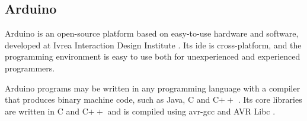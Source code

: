 \subsection{Arduino}
\label{sec:progplatarduino}
Arduino is an open-source platform based on easy-to-use hardware and software, developed at Ivrea Interaction Design Institute  \cite{arduino2}. Its \acrfull{ide} is cross-platform, and the programming environment is easy to use both for unexperienced and experienced programmers.

Arduino programs may be written in any programming language with a compiler that produces binary machine code, such as Java, C and C$++$ \cite{arduino}. Its core libraries are written in C and C$++$ and is compiled using avr-gcc and AVR Libc \cite{arduinobuild}.